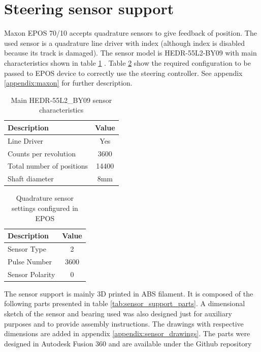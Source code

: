 \section{Steering sensor support}
Maxon EPOS 70/10 accepts quadrature sensors to give feedback of position. The used sensor is a quadrature line driver with index (although index is disabled because its track is damaged). The sensor model is HEDR-55L2-BY09 with main characteristics shown in table \ref{tab:quad_sensor} \cite{hedr_sensor}. Table \ref{tab:quad_sensor_settings} show the required configuration to be passed to EPOS device to correctly use the steering controller. See appendix \ref{appendix:maxon} for further description.
\begin{table}[!hb]
	\centering
	\begin{tabular}{lc}
		\toprule
		\textbf{Description} & \textbf{Value}\\
		\midrule
		Line Driver & Yes\\
		Counts per revolution & 3600\\
		Total number of positions & 14400\\
		Shaft diameter & 8mm\\
		\bottomrule
	\end{tabular}
	\caption{Main HEDR-55L2\_BY09 sensor characteristics}
	\label{tab:quad_sensor}
\end{table}

\begin{table}[!hb]
	\centering
	\begin{tabular}{lc}
		\toprule
		\textbf{Description} & \textbf{Value}\\
		\midrule
		Sensor Type & 2\\
		Pulse Number & 3600\\
		Sensor Polarity & 0\\
		\bottomrule
	\end{tabular}
	\caption{Quadrature sensor settings configured in EPOS}
	\label{tab:quad_sensor_settings}
\end{table}

The sensor support is mainly 3D printed in ABS filament. It is composed of the following parts presented in table \ref{tab:sensor_support_parts}.
A dimensional sketch of the sensor and bearing used was also designed just for auxiliary purposes and to provide assembly instructions. The drawings with respective dimensions are added in appendix \ref{appendix:sensor_drawings}. The parts were designed in Autodesk Fusion 360 and are available under the Github repository


